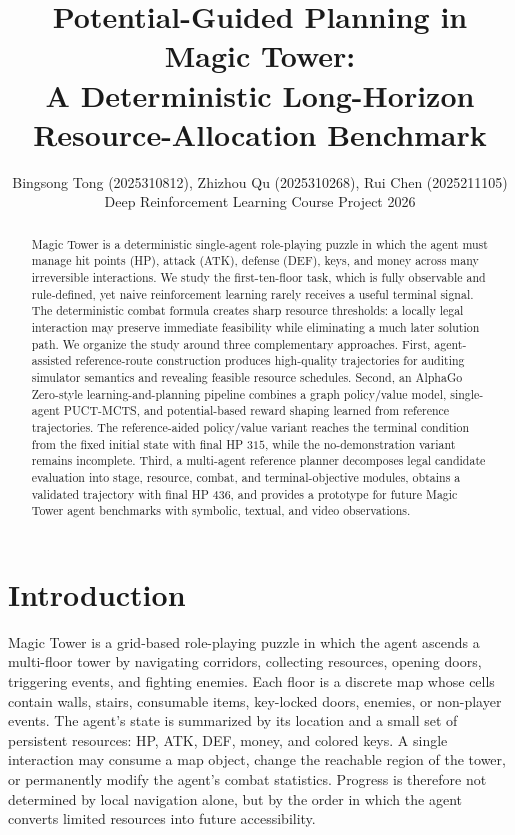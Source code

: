 \documentclass{article}
\title{Potential-Guided Planning in Magic Tower:\\
A Deterministic Long-Horizon\\
Resource-Allocation Benchmark}
\author{
Bingsong Tong (2025310812), Zhizhou Qu (2025310268), Rui Chen (2025211105)\\
Deep Reinforcement Learning Course Project 2026
}
\begin{document}
\raggedbottom
\maketitle
{}

\begin{abstract}
Magic Tower is a deterministic single-agent role-playing puzzle in which the
agent must manage hit points (HP), attack (ATK), defense (DEF), keys, and money
across many irreversible interactions.  We study the first-ten-floor task, which
is fully observable and rule-defined, yet naive reinforcement learning rarely
receives a useful terminal signal.  The deterministic combat formula creates
sharp resource thresholds: a locally legal interaction may preserve immediate
feasibility while eliminating a much later solution path.  We organize the study
around three complementary approaches.  First, agent-assisted reference-route
construction produces high-quality trajectories for auditing simulator semantics
and revealing feasible resource schedules.  Second, an AlphaGo Zero-style
learning-and-planning pipeline combines a graph policy/value model,
single-agent PUCT-MCTS, and potential-based reward shaping learned from
reference trajectories.  The reference-aided policy/value variant reaches the
terminal condition from the fixed initial state with final HP \(315\), while the
no-demonstration variant remains incomplete.  Third, a multi-agent reference
planner decomposes legal candidate evaluation into stage, resource, combat, and
terminal-objective modules, obtains a validated trajectory with final HP
\(436\), and provides a prototype for future Magic Tower agent benchmarks with
symbolic, textual, and video observations.
\end{abstract}

\section{Introduction}
Magic Tower is a grid-based role-playing puzzle in which the agent ascends a
multi-floor tower by navigating corridors, collecting resources, opening doors,
triggering events, and fighting enemies.  Each floor is a discrete map whose
cells contain walls, stairs, consumable items, key-locked doors, enemies, or
non-player events.  The agent's state is summarized by its location and a small
set of persistent resources: HP, ATK, DEF, money, and colored keys.  A
single interaction may consume a map object, change the reachable region of the
tower, or permanently modify the agent's combat statistics.  Progress is
therefore not determined by local navigation alone, but by the order in which
the agent converts limited resources into future accessibility.
\end{document}
